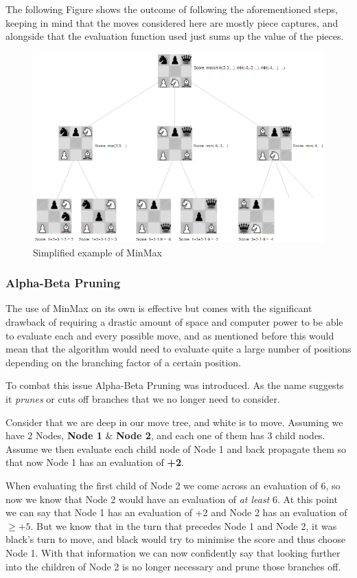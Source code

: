 The following Figure shows the outcome of following the aforementioned steps, keeping in mind that the moves considered here are mostly piece captures, and alongside that the evaluation function used just sums up the value of the pieces.

\begin{figure}[h]
    \centering
    \includegraphics[scale=0.45]{images/minMaxscored.png}
    \caption{Simplified example of MinMax}
    \label{minmax}
\end{figure}

\subsubsection{Alpha-Beta Pruning}

The use of MinMax on its own is effective but comes with the significant drawback of requiring a drastic amount of space and computer power to be able to evaluate each and every possible move, and as mentioned before this would mean that the algorithm would need to evaluate quite a large number of positions depending on the branching factor of a certain position.

To combat this issue Alpha-Beta Pruning was introduced. As the name suggests it \textit{prunes} or cuts off branches that we no longer need to consider. 

Consider that we are deep in our move tree, and white is to move. Assuming we have 2 Nodes, \textbf{Node 1} \& \textbf{Node 2}, and each one of them has 3 child nodes. Assume we then evaluate each child node of Node 1 and back propagate them so that now Node 1 has an evaluation of \textbf{+2}.

When evaluating the first child of Node 2 we come across an evaluation of 6, so now we know that Node 2 would have an evaluation of \textit{at least} 6. At this point we can say that Node 1 has an evaluation of +2 and Node 2 has an evaluation of $\geq+5$. But we know that in the turn that precedes Node 1 and Node 2, it was black's turn to move, and black would try to minimise the score and thus choose Node 1. With that information we can now confidently say that looking further into the children of Node 2 is no longer necessary and prune those branches off.

